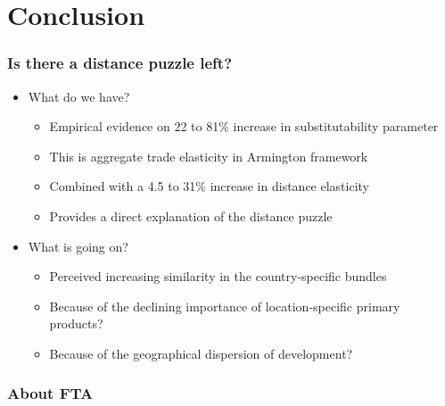 \documentclass{beamer}
\begin{document}
\section{Conclusion}
\begin{frame}\frametitle{Is there a distance puzzle left?}
\begin{itemize}
\item What do we have?
	\begin{itemize}
	\item Empirical evidence on 22 to 81\% increase in substitutability parameter
	\item This is aggregate trade elasticity in Armington framework
	\item Combined with a 4.5 to 31\% increase in distance elasticity
	\item Provides a direct explanation of the distance puzzle
	\end{itemize}
\item What is going on?
	\begin{itemize}
	\item Perceived increasing similarity in the country-specific bundles
	\item Because of the declining importance of location-specific primary products?
	\item Because of the geographical dispersion of development?
	\end{itemize}
\end{itemize}
\end{frame}


\begin{frame}[plain]\frametitle{About FTA}
	\begin{figure}[h!]
		\begin{center}
			\setlength{\fboxrule}{1pt} %
			\setlength{\fboxsep}{.1in} %
		\end{center}
	\end{figure}
\end{frame}
\end{document}
